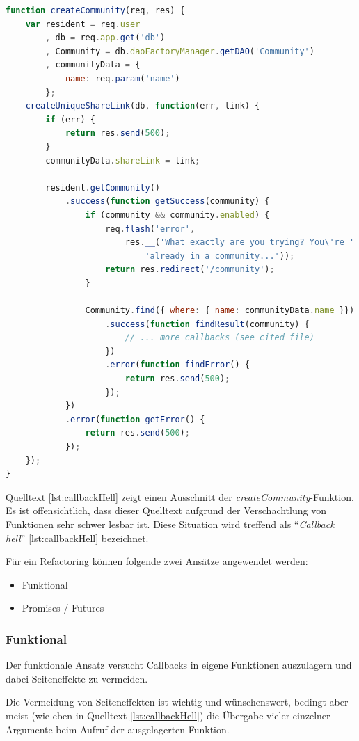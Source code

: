 \begin{lstlisting}[language=JavaScript, firstnumber=136, caption={Ausschnitt aus Community Controller mit Callback Hell \cite{milestone7CommunityController}}, label={lst:callbackHell}]
function createCommunity(req, res) {
	var resident = req.user
		, db = req.app.get('db')
		, Community = db.daoFactoryManager.getDAO('Community')
		, communityData = {
			name: req.param('name')
		};
	createUniqueShareLink(db, function(err, link) {
		if (err) {
			return res.send(500);
		}
		communityData.shareLink = link;

		resident.getCommunity()
			.success(function getSuccess(community) {
				if (community && community.enabled) {
					req.flash('error',
						res.__('What exactly are you trying? You\'re ' +
							'already in a community...'));
					return res.redirect('/community');
				}

				Community.find({ where: { name: communityData.name }})
					.success(function findResult(community) {
						// ... more callbacks (see cited file)
					})
					.error(function findError() {
						return res.send(500);
					});
			})
			.error(function getError() {
				return res.send(500);
			});
	});
}
\end{lstlisting}

Quelltext \ref{lst:callbackHell} zeigt einen Ausschnitt der \emph{createCommunity}-Funktion. Es ist offensichtlich, dass dieser Quelltext aufgrund der Verschachtlung von Funktionen sehr schwer lesbar ist. Diese Situation wird treffend als ``\emph{Callback hell}'' \ref{lst:callbackHell} bezeichnet.

Für ein Refactoring können folgende zwei Ansätze angewendet werden:

\begin{itemize}
	\item Funktional
	\item Promises / Futures
\end{itemize}

\subsubsection*{Funktional}
Der funktionale Ansatz versucht Callbacks in eigene Funktionen auszulagern und dabei Seiteneffekte zu vermeiden.

Die Vermeidung von Seiteneffekten ist wichtig und wünschenswert, bedingt aber meist (wie eben in Quelltext \ref{lst:callbackHell}) die Übergabe vieler einzelner Argumente beim Aufruf der ausgelagerten Funktion.

